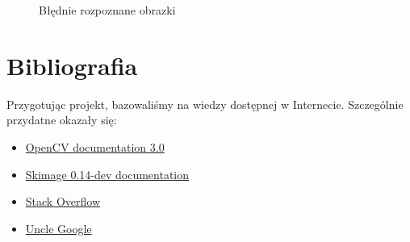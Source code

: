 \documentclass{mwart}
\begin{document}
\begin{figure}[H]
\begin{center}
{        }
    \end{center}
    \caption{Błędnie rozpoznane obrazki}
   \label{fig:subfigures}
\end{figure}
\section{Bibliografia}

Przygotując projekt, bazowaliśmy na wiedzy dostępnej w Internecie. Szczególnie przydatne okazały się:

\begin{itemize}
    \item \href{https://docs.opencv.org/3.0-beta/index.html}{OpenCV documentation 3.0}
    \item \href{http://scikit-image.org/docs/dev/}{Skimage 0.14-dev documentation}
    \item \href{https://stackoverflow.com/}{Stack Overflow}
    \item \href{https://google.com/}{Uncle Google}
\end{itemize}
\end{document}
